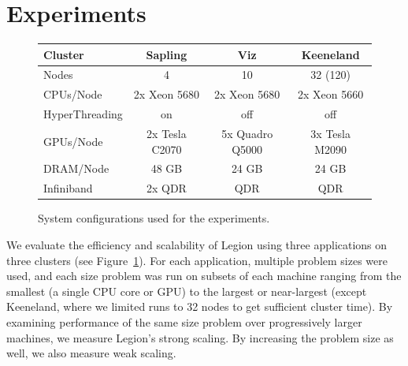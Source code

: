 \section{Experiments}
\label{sec:exp}



\begin{figure}
{\footnotesize
\begin{tabular}{l|ccc}
Cluster & Sapling & Viz & Keeneland \\
\midrule
Nodes   &   4     &  10 &  32 (120) \\
CPUs/Node & 2x Xeon 5680 & 2x Xeon 5680 & 2x Xeon 5660 \\
HyperThreading & on & off & off \\
GPUs/Node & 2x Tesla C2070 & 5x Quadro Q5000 & 3x Tesla M2090 \\
DRAM/Node & 48 GB & 24 GB & 24 GB \\
Infiniband & 2x QDR & QDR & QDR \\
\end{tabular}
}
\vspace{-2mm}
\caption{System configurations used for the experiments. \label{fig:systems}}
\vspace{-6mm}
\end{figure}

%
%
%  


We evaluate the efficiency and scalability of Legion using
three applications on three clusters (see Figure~\ref{fig:systems}).
For each application, multiple problem sizes were used, and each size problem was
run on subsets of each machine ranging from the smallest (a single CPU core or GPU)
to the largest or near-largest (except Keeneland, where we limited
runs to 32 nodes to get sufficient cluster time).
By examining performance of the same size problem over progressively larger
machines, we measure Legion's strong scaling.
By increasing the problem size as well, we also measure weak scaling.

